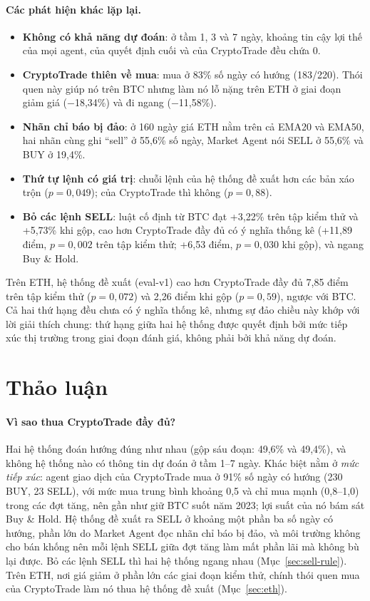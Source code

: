 \paragraph{Các phát hiện khác lặp lại.}
\begin{itemize}
  \item \textbf{Không có khả năng dự đoán}: ở tầm 1, 3 và 7 ngày, khoảng tin cậy lợi thế của mọi agent, của quyết định
  cuối và của CryptoTrade đều chứa 0.
  \item \textbf{CryptoTrade thiên về mua}: mua ở 83\% số ngày có hướng (183/220). Thói quen này giúp nó trên BTC nhưng
  làm nó lỗ nặng trên ETH ở giai đoạn giảm giá ($-$18,34\%) và đi ngang ($-$11,58\%).
  \item \textbf{Nhãn chỉ báo bị đảo}: ở 160 ngày giá ETH nằm trên cả EMA20 và EMA50, hai nhãn cùng ghi ``sell'' ở 55,6\%
  số ngày, Market Agent nói SELL ở 55,6\% và BUY ở 19,4\%.
  \item \textbf{Thứ tự lệnh có giá trị}: chuỗi lệnh của hệ thống đề xuất hơn các bản xáo trộn ($p=0{,}049$); của
  CryptoTrade thì không ($p=0{,}88$).
  \item \textbf{Bỏ các lệnh SELL}: luật cố định từ BTC đạt +3,22\% trên tập kiểm thử và +5,73\% khi gộp, cao hơn
  CryptoTrade đầy đủ có ý nghĩa thống kê (+11,89 điểm, $p=0{,}002$ trên tập kiểm thử; +6,53 điểm, $p=0{,}030$ khi gộp),
  và ngang Buy \& Hold.
\end{itemize}

Trên ETH, hệ thống đề xuất (eval-v1) cao hơn CryptoTrade đầy đủ 7,85 điểm trên tập kiểm thử ($p=0{,}072$) và 2,26 điểm
khi gộp ($p=0{,}59$), ngược với BTC. Cả hai thứ hạng đều chưa có ý nghĩa thống kê, nhưng sự đảo chiều này khớp với lời
giải thích chung: thứ hạng giữa hai hệ thống được quyết định bởi mức tiếp xúc thị trường trong giai đoạn đánh giá, không
phải bởi khả năng dự đoán.

\section{Thảo luận}
\paragraph{Vì sao thua CryptoTrade đầy đủ?} Hai hệ thống đoán hướng đúng như nhau (gộp sáu đoạn: 49,6\% và 49,4\%), và
không hệ thống nào có thông tin dự đoán ở tầm 1--7 ngày. Khác biệt nằm ở \emph{mức tiếp xúc}: agent giao dịch của
CryptoTrade mua ở 91\% số ngày có hướng (230 BUY, 23 SELL), với mức mua trung bình khoảng 0,5 và chỉ mua mạnh (0,8--1,0)
trong các đợt tăng, nên gần như giữ BTC suốt năm 2023; lợi suất của nó bám sát Buy \& Hold. Hệ thống đề xuất ra SELL ở
khoảng một phần ba số ngày có hướng, phần lớn do Market Agent đọc nhãn chỉ báo bị đảo, và môi trường không cho bán khống
nên mỗi lệnh SELL giữa đợt tăng làm mất phần lãi mà không bù lại được. Bỏ các lệnh SELL thì hai hệ thống ngang nhau
(Mục~\ref{sec:sell-rule}). Trên ETH, nơi giá giảm ở phần lớn các giai đoạn kiểm thử, chính thói quen mua của CryptoTrade
làm nó thua hệ thống đề xuất (Mục~\ref{sec:eth}).

